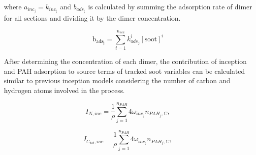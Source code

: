 where ${a_{inc_j} = k_{inc_{j}}}$ and ${b_{ads_j}}$ is calculated by summing the adsorption rate of dimer for all sections and dividing it by the dimer concentration.

\begin{equation}
	\mathrm{b_{ads_j}} = \sum_{i=1}^{n_{sec}} k^i_{ads_{j}} [\mathrm{soot}]^i
\end{equation}


After determining the concentration of each dimer, the contribution of inception and PAH adsorption to source terms of tracked soot variables can be calculated similar to previous inception models considering the number of carbon and hydrogen atoms involved in the process.

\begin{equation}
	I_{N,{inc}} = \frac{1}{\rho}
	\sum_{j=1}^{n_{PAH}}
	4\omega_{inc_{j}} 
	n_{PAH_j,C}
	\label{eqn:IN_inc_dimcoal},
\end{equation}

\begin{equation}
	I_{C_{tot},{inc}} = \frac{1}{\rho}
	\sum_{j=1}^{n_{PAH}}
	4\omega_{inc_{j}} 
	n_{PAH_j,C}
	\label{eqn:ICtot_inc_dimcoal},
\end{equation}

